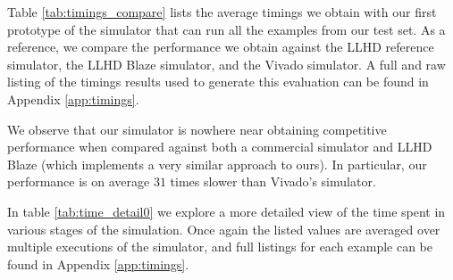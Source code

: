 Table \ref{tab:timings_compare} lists the average timings we obtain with our first prototype of the simulator that can run all the examples from our test set. As a reference, we compare the performance we obtain against the LLHD reference simulator, the LLHD Blaze simulator, and the Vivado simulator. A full and raw listing of the timings results used to generate this evaluation can be found in Appendix \ref{app:timings}.

We observe that our simulator is nowhere near obtaining competitive performance when compared against both a commercial simulator and LLHD Blaze (which implements a very similar approach to ours). In particular, our performance is on average $31$ times slower than Vivado's simulator.

In table \ref{tab:time_detail0} we explore a more detailed view of the time spent in various stages of the simulation. Once again the listed values are averaged over multiple executions of the simulator, and full listings for each example can be found in Appendix \ref{app:timings}.

